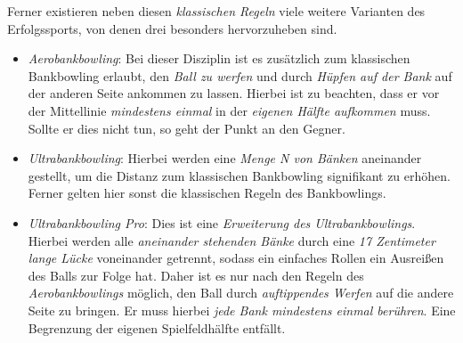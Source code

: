\clearpage
\noindent Ferner existieren neben diesen \textit{klassischen Regeln} viele weitere Varianten des Erfolgssports, von denen drei besonders hervorzuheben sind.
\begin{itemize}
\item \textit{Aerobankbowling}: Bei dieser Disziplin ist es zusätzlich zum klassischen Bankbowling erlaubt, den \textit{Ball zu werfen} und durch \textit{Hüpfen auf der Bank} auf der anderen Seite ankommen zu lassen. Hierbei ist zu beachten, dass er vor der Mittellinie \textit{mindestens einmal} in der \textit{eigenen Hälfte aufkommen} muss. Sollte er dies nicht tun, so geht der Punkt an den Gegner.
\item \textit{Ultrabankbowling}: Hierbei werden eine \textit{Menge \textit{N} von Bänken} aneinander gestellt, um die Distanz zum klassischen Bankbowling signifikant zu erhöhen. Ferner gelten hier sonst die klassischen Regeln des Bankbowlings.
\item \textit{Ultrabankbowling Pro}: Dies ist eine \textit{Erweiterung des Ultrabankbowlings}. Hierbei werden alle \textit{aneinander stehenden Bänke} durch eine \textit{17 Zentimeter lange Lücke} voneinander getrennt, sodass ein einfaches Rollen ein Ausreißen des Balls zur Folge hat. Daher ist es nur nach den Regeln des \textit{Aerobankbowlings} möglich, den Ball durch \textit{auftippendes Werfen} auf die andere Seite zu bringen. Er muss hierbei \textit{jede Bank mindestens einmal berühren}. Eine Begrenzung der eigenen Spielfeldhälfte entfällt.
\end{itemize}

